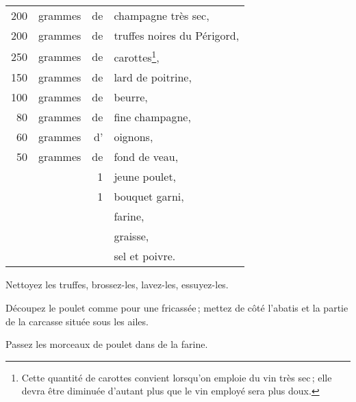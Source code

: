 \footnotesize
\begin{longtable}{rrrp{16em}}
    200 & grammes & de & champagne très sec,                                                              \\
    200 & grammes & de & truffes noires du Périgord,                                                      \\
    250 & grammes & de & carottes\footnote{Cette quantité de carottes convient lorsqu'on emploie
                                           du vin très sec ; elle devra être diminuée d'autant
                                           plus que le vin employé sera plus doux.},                      \\
    150 & grammes & de & lard de poitrine,                                                                \\
    100 & grammes & de & beurre,                                                                          \\
     80 & grammes & de & fine champagne,                                                                  \\
     60 & grammes & d' & oignons,                                                                         \\
     50 & grammes & de & fond de veau,                                                                    \\
        &         &  1 & jeune poulet,                                                                    \\
        &         &  1 & bouquet garni,                                                                   \\
        &         &    & farine,                                                                          \\
        &         &    & graisse,                                                                         \\
        &         &    & sel et poivre.                                                                   \\
\end{longtable}
\normalsize

Nettoyez les truffes, brossez-les, lavez-les, essuyez-les.

Découpez le poulet comme pour une fricassée ; mettez de côté l'abatis et la
partie de la carcasse située sous les ailes.

Passez les morceaux de poulet dans de la farine.

